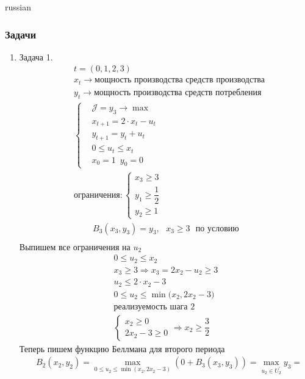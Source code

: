 \documentclass{article}
\begin{document}
\begin{otherlanguage*}{russian}
\begin{itemize}
\subsubsection*{Задачи}
\begin{enumerate}
\item Задача 1. 
\begin{align*}
& t = (0, 1, 2, 3) \\
& x_t \rightarrow \text{мощность производства средств производства} \\
& y_t \rightarrow \text{мощность производства средств потребления} \\
& \begin{cases} 
& \mathcal{J} = y_3 \rightarrow \max \\
& x_{t + 1} = 2 \cdot x_t - u_t \\
& y_{t+1} = y_t + u_t \\
& 0 \le u_t \le x_t \\
& x_0 = 1 \,\,\, y_0 = 0 
\end{cases} \\
& \text{ограничения}: \begin{cases} 
x_3 \ge 3 \\
y_1 \ge \dfrac{1}{2} \\
y_2 \ge 1 
\end{cases}
\end{align*}
\begin{align*}
B_3 (x_3, y_3) = y_3, \,\,\,\, x_3 \ge 3  \,\,\,\, \text{по условию} \\
\end{align*}
Выпишем все ограничения на $ u_2 $ 
\begin{align*}
0 \le u_2 \le x_2 \\
x_3 \ge 3 \Rightarrow x_3 = 2 x_2 - u_2  \ge 3 \\
u_2 \le 2 \cdot x_2 - 3 \\
0 \le u_2 \le \min \Big( x_2, 2x_2 - 3 \Big) \\
\text{реализуемость шага 2} \\
\begin{cases}
x_2 \ge 0 \\
2 x_2 - 3 \ge 0 
\end{cases} \Rightarrow x_2 \ge \dfrac{3}{2} 
\end{align*}
Теперь пишем функцию Беллмана для второго периода 
\begin{align*}
& B_2 (x_2, y_2) = \max_{ 0 \le u_2 \le \min (x_2, 2x_2 - 3 )}  (0 + B_3(x_3, y_3)) =  \max_{u_2 \in U^{'}_2} y_3 = \\

\end{align*}
\end{enumerate}
\end{itemize}
\end{otherlanguage*}
\end{document}

